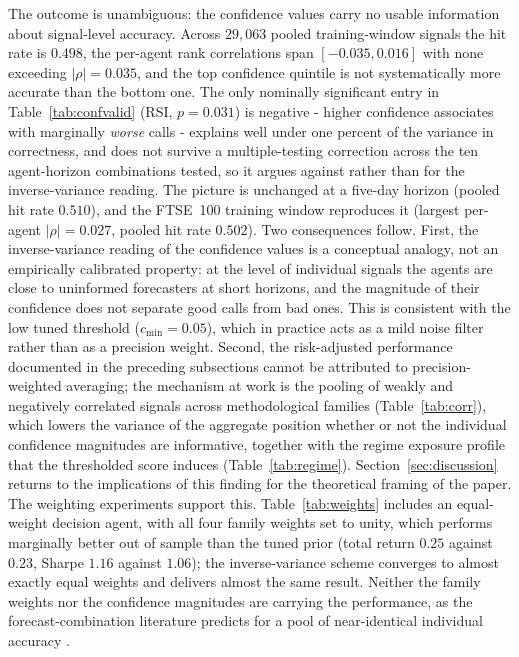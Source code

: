 \documentclass{ieeeaccess}
\newcommand{\TRtest}{\ensuremath{0.23}}
\newcommand{\Shtest}{\ensuremath{1.06}}
\newcommand{\BestMinConf}{\ensuremath{0.05}}
\newcommand{\WSEqualTR}{\ensuremath{0.25}}
\newcommand{\WSEqualSharpe}{\ensuremath{1.16}}
\newcommand{\ConfN}{\ensuremath{29{,}063}}
\newcommand{\ConfPooledHit}{\ensuremath{0.498}}
\newcommand{\ConfPooledHitFive}{\ensuremath{0.510}}
\newcommand{\ConfRhoMin}{\ensuremath{-0.035}}
\newcommand{\ConfRhoMax}{\ensuremath{0.016}}
\newcommand{\ConfRhoMaxAbs}{\ensuremath{0.035}}
\newcommand{\FtseConfRhoMaxAbs}{\ensuremath{0.027}}
\newcommand{\FtseConfPooledHit}{\ensuremath{0.502}}
\begin{document}
The outcome is unambiguous: the confidence values carry no usable information about signal-level accuracy. Across \ConfN{} pooled training-window signals the hit rate is \ConfPooledHit{}, the per-agent rank correlations span $[\ConfRhoMin{}, \ConfRhoMax{}]$ with none exceeding $|\rho| = \ConfRhoMaxAbs{}$, and the top confidence quintile is not systematically more accurate than the bottom one. The only nominally significant entry in Table~\ref{tab:confvalid} (RSI, $p = 0.031$) is negative - higher confidence associates with marginally \emph{worse} calls - explains well under one percent of the variance in correctness, and does not survive a multiple-testing correction across the ten agent-horizon combinations tested, so it argues against rather than for the inverse-variance reading. The picture is unchanged at a five-day horizon (pooled hit rate \ConfPooledHitFive{}), and the FTSE~100 training window reproduces it (largest per-agent $|\rho| = \FtseConfRhoMaxAbs{}$, pooled hit rate \FtseConfPooledHit{}). Two consequences follow. First, the inverse-variance reading of the confidence values is a conceptual analogy, not an empirically calibrated property: at the level of individual signals the agents are close to uninformed forecasters at short horizons, and the magnitude of their confidence does not separate good calls from bad ones. This is consistent with the low tuned threshold ($c_{\min} = \BestMinConf{}$), which in practice acts as a mild noise filter rather than as a precision weight. Second, the risk-adjusted performance documented in the preceding subsections cannot be attributed to precision-weighted averaging; the mechanism at work is the pooling of weakly and negatively correlated signals across methodological families (Table~\ref{tab:corr}), which lowers the variance of the aggregate position whether or not the individual confidence magnitudes are informative, together with the regime exposure profile that the thresholded score induces (Table~\ref{tab:regime}). Section~\ref{sec:discussion} returns to the implications of this finding for the theoretical framing of the paper. The weighting experiments support this. Table~\ref{tab:weights} includes an equal-weight decision agent, with all four family weights set to unity, which performs marginally better out of sample than the tuned prior (total return \WSEqualTR{} against \TRtest{}, Sharpe \WSEqualSharpe{} against \Shtest{}); the inverse-variance scheme converges to almost exactly equal weights and delivers almost the same result. Neither the family weights nor the confidence magnitudes are carrying the performance, as the forecast-combination literature predicts for a pool of near-identical individual accuracy \cite{clemen1989,smithwallis2009}.
\end{document}
